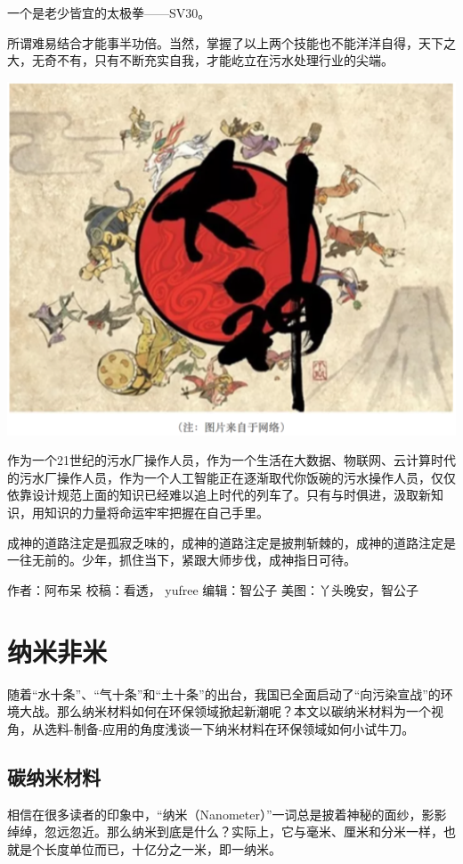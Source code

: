 \documentclass[]{book}
\begin{document}
一个是老少皆宜的太极拳------SV30。

所谓难易结合才能事半功倍。当然，掌握了以上两个技能也不能洋洋自得，天下之大，无奇不有，只有不断充实自我，才能屹立在污水处理行业的尖端。

\includegraphics[width=6.67in]{images/os4}

作为一个21世纪的污水厂操作人员，作为一个生活在大数据、物联网、云计算时代的污水厂操作人员，作为一个人工智能正在逐渐取代你饭碗的污水操作人员，仅仅依靠设计规范上面的知识已经难以追上时代的列车了。只有与时俱进，汲取新知识，用知识的力量将命运牢牢把握在自己手里。

成神的道路注定是孤寂乏味的，成神的道路注定是披荆斩棘的，成神的道路注定是一往无前的。少年，抓住当下，紧跟大师步伐，成神指日可待。

作者：阿布呆 校稿：看透， yufree 编辑：智公子 美图：丫头晚安，智公子

\section{纳米非米}

随着``水十条''、``气十条''和``土十条''的出台，我国已全面启动了``向污染宣战''的环境大战。那么纳米材料如何在环保领域掀起新潮呢？本文以碳纳米材料为一个视角，从选料-制备-应用的角度浅谈一下纳米材料在环保领域如何小试牛刀。

\subsection{碳纳米材料}

相信在很多读者的印象中，``纳米（Nanometer）''一词总是披着神秘的面纱，影影绰绰，忽远忽近。那么纳米到底是什么？实际上，它与毫米、厘米和分米一样，也就是个长度单位而已，十亿分之一米，即一纳米。
\end{document}
